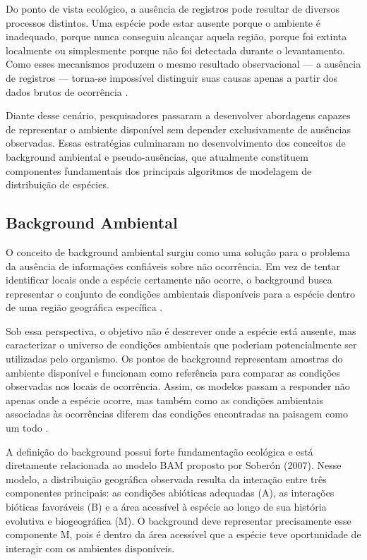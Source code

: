 Do ponto de vista ecológico, a ausência de registros pode resultar de diversos processos distintos. Uma espécie pode estar ausente porque o ambiente é inadequado, porque nunca conseguiu alcançar aquela região, porque foi extinta localmente ou simplesmente porque não foi detectada durante o levantamento. Como esses mecanismos produzem o mesmo resultado observacional — a ausência de registros — torna-se impossível distinguir suas causas apenas a partir dos dados brutos de ocorrência \citep{soberon2007grinnellian}.

Diante desse cenário, pesquisadores passaram a desenvolver abordagens capazes de representar o ambiente disponível sem depender exclusivamente de ausências observadas. Essas estratégias culminaram no desenvolvimento dos conceitos de background ambiental e pseudo-ausências, que atualmente constituem componentes fundamentais dos principais algoritmos de modelagem de distribuição de espécies.

\subsection{Background Ambiental}

O conceito de background ambiental surgiu como uma solução para o problema da ausência de informações confiáveis sobre não ocorrência. Em vez de tentar identificar locais onde a espécie certamente não ocorre, o background busca representar o conjunto de condições ambientais disponíveis para a espécie dentro de uma região geográfica específica \citep{phillips2009sample}.

Sob essa perspectiva, o objetivo não é descrever onde a espécie está ausente, mas caracterizar o universo de condições ambientais que poderiam potencialmente ser utilizadas pelo organismo. Os pontos de background representam amostras do ambiente disponível e funcionam como referência para comparar as condições observadas nos locais de ocorrência. Assim, os modelos passam a responder não apenas onde a espécie ocorre, mas também como as condições ambientais associadas às ocorrências diferem das condições encontradas na paisagem como um todo \citep{elith2011statistical}.

A definição do background possui forte fundamentação ecológica e está diretamente relacionada ao modelo BAM proposto por Soberón (2007). Nesse modelo, a distribuição geográfica observada resulta da interação entre três componentes principais: as condições abióticas adequadas (A), as interações bióticas favoráveis (B) e a área acessível à espécie ao longo de sua história evolutiva e biogeográfica (M). O background deve representar precisamente esse componente M, pois é dentro da área acessível que a espécie teve oportunidade de interagir com os ambientes disponíveis.

